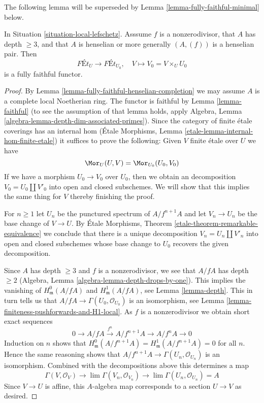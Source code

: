 \noindent
The following lemma will be superseded by
Lemma \ref{lemma-fully-faithful-minimal} below.

\begin{lemma}
\label{lemma-fully-faithful}
In Situation \ref{situation-local-lefschetz}.
Asssume $f$ is a nonzerodivisor, that $A$ has depth $\geq 3$, and that
$A$ is henselian or more generally $(A, (f))$ is a henselian pair. Then
$$
\textit{F\'Et}_U \longrightarrow \textit{F\'Et}_{U_0},\quad
V \longmapsto V_0 = V \times_U U_0
$$
is a fully faithful functor.
\end{lemma}

\begin{proof}
By Lemma \ref{lemma-fully-faithful-henselian-completion} we may assume $A$
is a complete local Noetherian ring. The functor is faithful by
Lemma \ref{lemma-faithful} (to see the assumption of that lemma holds, apply
Algebra, Lemma \ref{algebra-lemma-depth-dim-associated-primes}).
Since the category of finite \'etale coverings has an internal hom
(\'Etale Morphisms, Lemma \ref{etale-lemma-internal-hom-finite-etale})
it suffices to prove the following: Given $V$ finite \'etale over $U$ we have
$$
\Mor_U(U, V) = \Mor_{U_0}(U_0, V_0)
$$
If we have a morphism $U_0 \to V_0$ over $U_0$, then we obtain an
decomposition $V_0 = U_0 \amalg V'_0$ into open and closed subschemes.
We will show that this implies the same thing for $V$ thereby
finishing the proof.

\medskip\noindent
For $n \geq 1$ let $U_n$ be the punctured spectrum of $A/f^{n + 1}A$
and let $V_n \to U_n$ be the base change of $V \to U$. By
\'Etale Morphisms, Theorem \ref{etale-theorem-remarkable-equivalence}
we conclude that there is a unique decomposition
$V_n = U_n \amalg V'_n$
into open and closed subschemes whose base change to $U_0$ recovers
the given decomposition.

\medskip\noindent
Since $A$ has depth $\geq 3$ and $f$ is a nonzerodivisor, we see
that $A/fA$ has depth $\geq 2$
(Algebra, Lemma \ref{algebra-lemma-depth-drops-by-one}).
This implies the
vanishing of $H^0_\mathfrak m(A/fA)$ and $H^1_\mathfrak m(A/fA)$, see
Lemma \ref{lemma-depth}.
This in turn
tells us that $A/fA \to \Gamma(U_0, \mathcal{O}_{U_0})$ is an isomorphism, see
Lemma \ref{lemma-finiteness-pushforwards-and-H1-local}.
As $f$ is a nonzerodivisor we obtain short exact sequences
$$
0 \to A/fA \xrightarrow{f^n} A/f^{n + 1}A \to A/f^n A \to 0
$$
Induction on $n$ shows that
$H^0_\mathfrak m(A/f^{n + 1}A) = H^1_\mathfrak m(A/f^{n + 1}A) = 0$
for all $n$. Hence the same reasoning shows that
$A/f^{n + 1}A \to \Gamma(U_n, \mathcal{O}_{U_n})$
is an isomorphism.
Combined with the decompositions above this determines a map
$$
\Gamma(V, \mathcal{O}_V) \to
\lim \Gamma(V_n, \mathcal{O}_{V_n}) \to
\lim \Gamma(U_n, \mathcal{O}_{U_n}) = A
$$
Since $V \to U$ is affine, this $A$-algebra map corresponds to
a section $U \to V$ as desired.
\end{proof}

